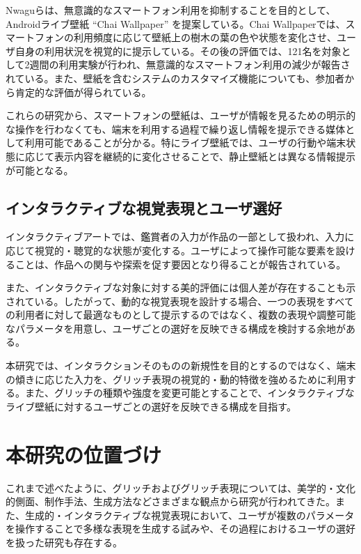 Nwaguらは、無意識的なスマートフォン利用を抑制することを目的として、Androidライブ壁紙 ``Chai Wallpaper'' を提案している\cite{nwagu2023chai}。Chai Wallpaperでは、スマートフォンの利用頻度に応じて壁紙上の樹木の葉の色や状態を変化させ、ユーザ自身の利用状況を視覚的に提示している。その後の評価では、121名を対象として2週間の利用実験が行われ、無意識的なスマートフォン利用の減少が報告されている。また、壁紙を含むシステムのカスタマイズ機能についても、参加者から肯定的な評価が得られている。

これらの研究から、スマートフォンの壁紙は、ユーザが情報を見るための明示的な操作を行わなくても、端末を利用する過程で繰り返し情報を提示できる媒体として利用可能であることが分かる。特にライブ壁紙では、ユーザの行動や端末状態に応じて表示内容を継続的に変化させることで、静止壁紙とは異なる情報提示が可能となる。


\subsection{インタラクティブな視覚表現とユーザ選好}

インタラクティブアートでは、鑑賞者の入力が作品の一部として扱われ、入力に応じて視覚的・聴覚的な状態が変化する。ユーザによって操作可能な要素を設けることは、作品への関与や探索を促す要因となり得ることが報告されている\cite{krzyzaniak2022engaging}。

また、インタラクティブな対象に対する美的評価には個人差が存在することも示されている。したがって、動的な視覚表現を設計する場合、一つの表現をすべての利用者に対して最適なものとして提示するのではなく、複数の表現や調整可能なパラメータを用意し、ユーザごとの選好を反映できる構成を検討する余地がある。

本研究では、インタラクションそのものの新規性を目的とするのではなく、端末の傾きに応じた入力を、グリッチ表現の視覚的・動的特徴を強めるために利用する。また、グリッチの種類や強度を変更可能とすることで、インタラクティブなライブ壁紙に対するユーザごとの選好を反映できる構成を目指す。



\section{本研究の位置づけ}

これまで述べたように、グリッチおよびグリッチ表現については、美学的・文化的側面、制作手法、生成方法などさまざまな観点から研究が行われてきた。また、生成的・インタラクティブな視覚表現において、ユーザが複数のパラメータを操作することで多様な表現を生成する試みや、その過程におけるユーザの選好を扱った研究も存在する\cite{parikh2020generative,krzyzaniak2022engaging}。


